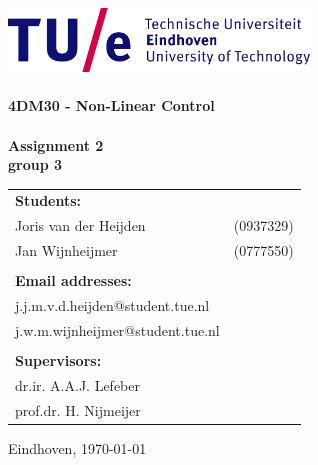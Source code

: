 \begin{titlepage}

\begin{center}

\includegraphics[width=0.6\textwidth]{./Figures/TUe}~\\[2cm]



\HRule \\[0.4cm]
{ \huge \bfseries 4DM30 - Non-Linear Control\\[0.3cm] }
\HRule \\[1.5cm]
\textbf{Assignment 2\\group 3}



\vfill

\begin{table}[h]
\begin{tabular}{ll}
\textbf{Students:} & \\
Joris van der Heijden & (0937329)\\
Jan Wijnheijmer & (0777550)\\

\\
\textbf{Email addresses:} & \\
j.j.m.v.d.heijden@student.tue.nl \\
j.w.m.wijnheijmer@student.tue.nl\\
\\
\textbf{Supervisors:} &\\
dr.ir. A.A.J. Lefeber  &\\
prof.dr. H. Nijmeijer
\\

\end{tabular}
\end{table}



\large
{ Eindhoven, \today}

\end{center}

\end{titlepage}
